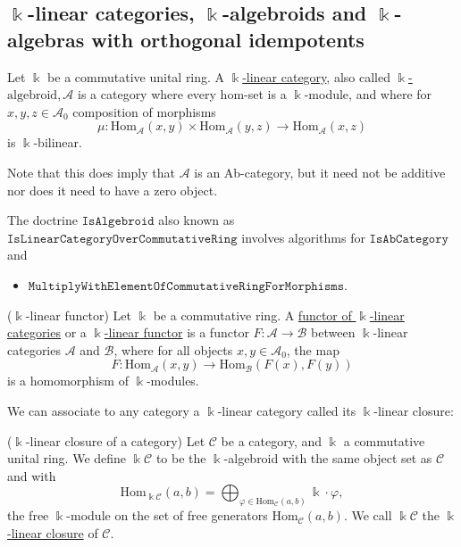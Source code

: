 \newpage
\subsection{$\Bbbk$-linear categories, $\Bbbk$-algebroids and $\Bbbk$-algebras with orthogonal idempotents}

\begin{definition}
Let $\Bbbk$ be a commutative unital ring. A \ul{$\Bbbk$-linear category}, also called \ul{$\Bbbk$-$\mathrm{algebroid}$},$\,\mathcal{A}$ is a
category where every hom-set is a $\Bbbk$-module, and where for $x,y,z \in \mathcal{A}_{0}$ composition of morphisms
\[
\mu : \mathrm{Hom}_{\mathcal{A}}(x,y) \times \mathrm{Hom}_{\mathcal{A}}(y,z) \rightarrow \mathrm{Hom}_{\mathcal{A}}(x,z)
\]
is $\Bbbk$-bilinear.

Note that this does imply that $\mathcal{A}$ is an Ab-category, but it need not be additive nor does it need to have a zero object.
\end{definition}

\begin{doctrine}
The doctrine $\mathtt{IsAlgebroid}$ also known as\\
$\mathtt{IsLinearCategoryOverCommutativeRing}$ involves algorithms for $\mathtt{IsAbCategory}$ and
\begin{itemize}
\item $\mathtt{MultiplyWithElementOfCommutativeRingForMorphisms}$.
\end{itemize}
\end{doctrine}

\begin{definition}{($\Bbbk$-linear functor)}
Let $\Bbbk$ be a commutative ring. A \ul{functor of $\Bbbk$-linear categories} or a \ul{$\Bbbk$-linear functor} is a functor
$F : \mathcal{A} \rightarrow \mathcal{B}$ between $\Bbbk$-linear categories $\mathcal{A}$ and $\mathcal{B}$,
where for all objects $x, y \in \mathcal{A}_{0}$, the map
\[
F : \mathrm{Hom}_{\mathcal{A}}(x,y) \rightarrow \mathrm{Hom}_{\mathcal{B}}(F(x), F(y))
\]
is a homomorphism of $\Bbbk$-modules.
\end{definition}

\noindent We can associate to any category a $\Bbbk$-linear category called its $\Bbbk$-linear closure:

\begin{definition}{($\Bbbk$-linear closure of a category)}
Let $\mathcal{C}$ be a category, and $\Bbbk$ a commutative unital ring. We define $\Bbbk \mathcal{C}$ to be
the $\Bbbk$-algebroid with the same object set as $\mathcal{C}$ and with 
\[
\mathrm{Hom}_{\Bbbk\mathcal{C}}(a,b) = \bigoplus_{\varphi \in \mathrm{Hom}_{\mathcal{C}}(a,b)} \Bbbk \cdot \varphi,
\]
the free $\Bbbk$-module on the set of free generators $\mathrm{Hom}_{\mathcal{C}}(a,b)$. We call $\Bbbk\mathcal{C}$ the
\ul{$\Bbbk$-linear closure} of $\mathcal{C}$.
\end{definition}

